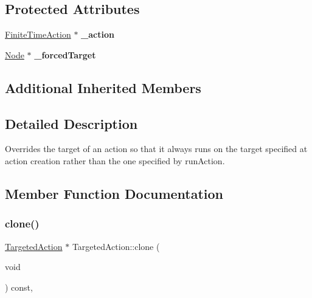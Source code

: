 \subsection*{Protected Attributes}
\begin{DoxyCompactItemize}
\item 
\mbox{\label{classTargetedAction_a39db0bac9929687b671b1035a7b10b7b}} 
\hyperlink{classFiniteTimeAction}{Finite\+Time\+Action} $\ast$ {\bfseries \+\_\+action}
\item 
\mbox{\label{classTargetedAction_a0d9d7e2bf18fd704047f5e8e8f1fd94d}} 
\hyperlink{classNode}{Node} $\ast$ {\bfseries \+\_\+forced\+Target}
\end{DoxyCompactItemize}
\subsection*{Additional Inherited Members}


\subsection{Detailed Description}
Overrides the target of an action so that it always runs on the target specified at action creation rather than the one specified by run\+Action. 

\subsection{Member Function Documentation}
\mbox{\label{classTargetedAction_ad94083c7a370faebf4ca01499c6ebf6a}} 
\subsubsection{\texorpdfstring{clone()}{clone()}\hspace{0.1cm}{\footnotesize\ttfamily [1/2]}}
{\footnotesize\ttfamily \hyperlink{classTargetedAction}{Targeted\+Action} $\ast$ Targeted\+Action\+::clone (\begin{DoxyParamCaption}\item[{void}]{ }\end{DoxyParamCaption}) const\hspace{0.3cm}{\ttfamily [override]}, {\ttfamily [virtual]}}

